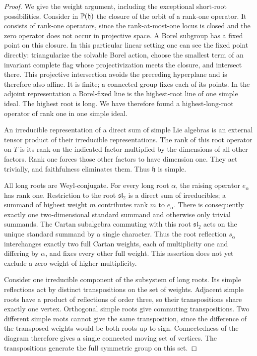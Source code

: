 \begin{proof}
We give the weight argument, including the exceptional short-root
possibilities.  Consider in $\mathbb P(\mathfrak h)$ the closure of
the orbit of a rank-one operator.  It consists of rank-one
operators, since the rank-at-most-one locus is closed and the zero
operator does not occur in projective space.  A Borel subgroup has
a fixed point on this closure.  In this particular linear setting
one can see the fixed point directly: triangularize the solvable
Borel action, choose the smallest term of an invariant complete
flag whose projectivization meets the closure, and intersect there.
This projective intersection avoids the preceding hyperplane and
is therefore also affine.  It is finite; a connected group fixes
each of its points.  In the adjoint representation a Borel-fixed
line is the highest-root line of one simple ideal.  The highest
root is long.  We have therefore found a highest-long-root
operator of rank one in one simple ideal.

An irreducible representation of a direct sum of simple Lie
algebras is an external tensor product of their irreducible
representations.  The rank of this root operator on $T$ is its
rank on the indicated factor multiplied by the dimensions of all
other factors.  Rank one forces those other factors to have
dimension one.  They act trivially, and faithfulness eliminates
them.  Thus $\mathfrak h$ is simple.

All long roots are Weyl-conjugate.  For every long root $\alpha$,
the raising operator $e_\alpha$ has rank one.  Restriction to the
root $\mathfrak{sl}_2$ is a direct sum of irreducibles; a summand
of highest weight $m$ contributes rank $m$ to $e_\alpha$.
There is consequently exactly one two-dimensional standard
summand and otherwise only trivial summands.  The Cartan
subalgebra commuting with this root $\mathfrak{sl}_2$ acts on
the unique standard summand by a single character.  Thus the root
reflection $s_\alpha$ interchanges exactly two full Cartan
weights, each of multiplicity one and differing by $\alpha$,
and fixes every other full weight.  This assertion does not yet
exclude a zero weight of higher multiplicity.

Consider one irreducible component of the subsystem of long roots.
Its simple reflections act by distinct transpositions on the set
of weights.  Adjacent simple roots have a product of reflections
of order three, so their transpositions share exactly one vertex.
Orthogonal simple roots give commuting transpositions.  Two
different simple roots cannot give the same transposition, since
the difference of the transposed weights would be both roots up
to sign.  Connectedness of the diagram therefore gives a single
connected moving set of vertices.  The transpositions generate
the full symmetric group on this set.


\end{proof}
